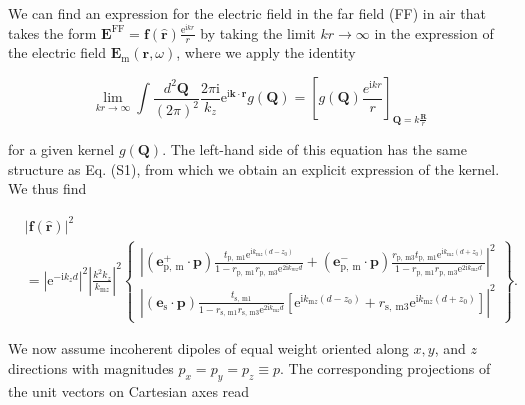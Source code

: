 \documentclass[10pt]{article}
\begin{document}
We can find an expression for the electric field in the far field (FF) in air that takes the form $\mathbf{E}^{\mathrm{FF}}= \boldsymbol{f}(\hat{\boldsymbol{r}}) \frac{\mathrm{e}^{\mathrm{i} k r}}{r}$ by taking the limit $k r \rightarrow \infty$ in the expression of the electric field $\mathbf{E}_{\mathrm{m}}(\mathbf{r}, \omega)$, where we apply the identity

$$
\lim _{k r \rightarrow \infty} \int \frac{d^{2} \mathbf{Q}}{(2 \pi)^{2}} \frac{2 \pi \mathrm{i}}{k_{z}} \mathrm{e}^{\mathrm{i} \mathbf{k} \cdot \mathbf{r}} g(\mathbf{Q})=\left[g(\mathbf{Q}) \frac{e^{\mathrm{i} k r}}{r}\right]_{\mathbf{Q}=k \frac{\mathbf{R}}{r}}
$$

for a given kernel $g(\mathbf{Q})$. The left-hand side of this equation has the same structure as Eq. (S1), from which we obtain an explicit expression of the kernel. We thus find

$$
\begin{aligned}
& |\boldsymbol{f}(\hat{\boldsymbol{r}})|^{2} \\
& =\left|\mathrm{e}^{-\mathrm{i} k_{z} d}\right|^{2}\left|\frac{k^{2} k_{z}}{k_{\mathrm{m} z}}\right|^{2}\left\{\begin{array}{c}
\left|\left(\mathbf{e}_{\mathrm{p}, \mathrm{~m}}^{+} \cdot \mathbf{p}\right) \frac{t_{\mathrm{p}, \mathrm{~m} 1} \mathrm{e}^{\mathrm{i} k_{\mathrm{m} z}\left(d-z_{0}\right)}}{1-r_{\mathrm{p}, \mathrm{~m} 1} r_{\mathrm{p}, \mathrm{~m} 3} \mathrm{e}^{2 \mathrm{i} k_{m z} d}}+\left(\mathbf{e}_{\mathrm{p}, \mathrm{~m}}^{-} \cdot \mathbf{p}\right) \frac{r_{\mathrm{p}, \mathrm{~m} 3} t_{\mathrm{p}, \mathrm{~m} 1} \mathrm{e}^{\mathrm{i} k_{\mathrm{m} z}\left(d+z_{0}\right)}}{1-r_{\mathrm{p}, \mathrm{~m} 1} r_{\mathrm{p}, \mathrm{~m} 3} \mathrm{e}^{2 \mathrm{i} k_{\mathrm{m} z} d}}\right|^{2} \\
\left|\left(\mathbf{e}_{\mathrm{s}} \cdot \mathbf{p}\right) \frac{t_{\mathrm{s}, \mathrm{~m} 1}}{1-r_{\mathrm{s}, \mathrm{~m} 1} r_{\mathrm{s}, \mathrm{~m} 3} \mathrm{e}^{2 \mathrm{i} k_{\mathrm{m} z} d}}\left[\mathrm{e}^{\mathrm{i} k_{\mathrm{m} z}\left(d-z_{0}\right)}+r_{\mathrm{s}, \mathrm{~m} 3} \mathrm{e}^{\mathrm{i} k_{\mathrm{m} z}\left(d+z_{0}\right)}\right]\right|^{2}
\end{array}\right\} .
\end{aligned}
$$

We now assume incoherent dipoles of equal weight oriented along $x, y$, and $z$ directions with magnitudes $p_{x}=p_{y}=p_{z} \equiv p$. The corresponding projections of the unit vectors on Cartesian axes read
\end{document}
